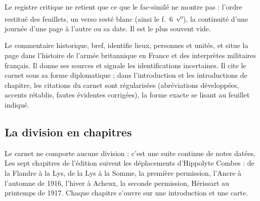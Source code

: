 Le registre critique ne retient que ce que le fac-similé ne montre pas : l'ordre restitué des feuillets, un verso resté blanc (ainsi le f.~6~v\textsuperscript{o}), la continuité d'une journée d'une page à l'autre ou sa date. Il est le plus souvent vide.

Le commentaire historique, bref, identifie lieux, personnes et unités, et situe la page dans l'histoire de l'armée britannique en France et des interprètes militaires français. Il donne ses sources et signale les identifications incertaines. Il cite le carnet sous sa forme diplomatique ; dans l'introduction et les introductions de chapitre, les citations du carnet sont régularisées (abréviations développées, accents rétablis, fautes évidentes corrigées), la forme exacte se lisant au feuillet indiqué.

\subsection{La division en chapitres}

Le carnet ne comporte aucune division : c'est une suite continue de notes datées. Les sept chapitres de l'édition suivent les déplacements d'Hippolyte Combes : de la Flandre à la Lys, de la Lys à la Somme, la première permission, l'Ancre à l'automne de 1916, l'hiver à Acheux, la seconde permission, Hérissart au printemps de 1917. Chaque chapitre s'ouvre sur une introduction et une carte.
